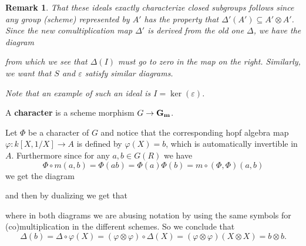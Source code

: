 \documentclass[12pt]{article}
\theoremstyle{nonumberbreak}
\theoremstyle{changebreak}
\theoremstyle{nonumberplain}
\theoremstyle{change}
\newtheorem{rmk}[thm]{Remark}
\newcommand{\Gm}{\ensuremath\mathbf{G_m}}
\begin{document}
\begin{rmk}
	That these ideals exactly characterize closed subgroups follows since any group (scheme) represented
	by $A'$ has the property that $\Delta'(A')\subseteq A'\otimes A'$. Since the new comultiplication map
	$\Delta'$ is derived from the old one $\Delta$, we have the diagram
	\begin{figure}[h]
	\end{figure}
	
	\noindent from which we see that $\Delta(I)$ must go to zero in the map on the right.
	Similarly, we want that $S$ and $\varepsilon$ satisfy similar diagrams.

	Note that an example of such an ideal is $I=\ker(\varepsilon)$.
\end{rmk}

\begin{defn}
	A \textbf{character} is a scheme morphism $G\to \Gm$.
\end{defn}

Let $\Phi$ be a character of $G$ and notice that the corresponding hopf algebra map 
$\varphi:k[X,1/X]\to A$ is defined by $\varphi(X)=b$, which
is automatically invertible in $A$. Furthermore since for any $a,b\in G(R)$ we have
\[\Phi\circ m(a,b)=\Phi(ab)=\Phi(a)\Phi(b)=m\circ(\Phi,\Phi)(a,b)\]
we get the diagram
\begin{figure}[h]
\end{figure}

\noindent and then by dualizing we get that
\newpage
\begin{figure}[h]
\end{figure}

\noindent where in both diagrams we are abusing notation by using the same symbols for 
(co)multiplication in the different schemes. So we conclude that 
\[\Delta(b)=\Delta\circ\varphi(X)=(\varphi\otimes\varphi)\circ \Delta(X)=(\varphi\otimes\varphi)(X\otimes X)=b\otimes b.\]
\end{document}
